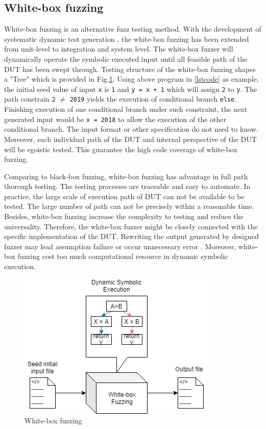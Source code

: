\subsection{White-box fuzzing}
White-box fuzzing is an alternative fuzz testing method. With the development of systematic dynamic test generation \cite{godefroid2005dart}, the white-box fuzzing has been extended from unit-level to integration and system level. The white-box fuzzer will dynamically operate the symbolic executed input until all feasible path of the DUT has been swept through. Testing structure of the white-box fuzzing shapes a "Tree" which is provided in Fig.\ref{fig:whitebox}. Using above program in \ref{lstcode} as example, the initial seed value of input \texttt{x} is \texttt{1} and \texttt{y = x + 1} which will assign \texttt{2} to \texttt{y}. The path constrain \texttt{2} $\neq$ \texttt{2019} yields the execution of conditional branch \texttt{else}. Finishing execution of one conditional branch under such constraint, the next generated input would be \texttt{x = 2018} to allow the execution of the other conditional branch. The input format or other specification do not need to know. Moreover, each individual path of the DUT and internal perspective of the DUT will be egoistic tested. This guarantee the high code coverage of white-box fuzzing. \cite{functest}

Comparing to black-box fuzzing, white-box fuzzing has advantage in full path thorough testing. The testing processes are traceable and easy to automate. In practice, the large scale of execution path of DUT can not be available to be tested. The large number of path can not be precisely within a reasonable time. Besides, white-box fuzzing increase the complexity to testing and reduce the universality. Therefore, the white-box fuzzer might be closely connected with the specific implementation of the DUT. Rewriting the output generated by designed fuzzer may lead assumption failure or occur unnecessary error \cite{nidhra2012black}\cite{bounimova2013billions}. Moreover, white-box fuzzing cost too much computational resource in dynamic symbolic execution. 
\begin{figure}[htb]
    \centering
    \includegraphics[scale=0.8]{MScThesisTemplate/Figs/whitebox.png}
    \caption{White-box fuzzing}
    \label{fig:whitebox}
\end{figure}
